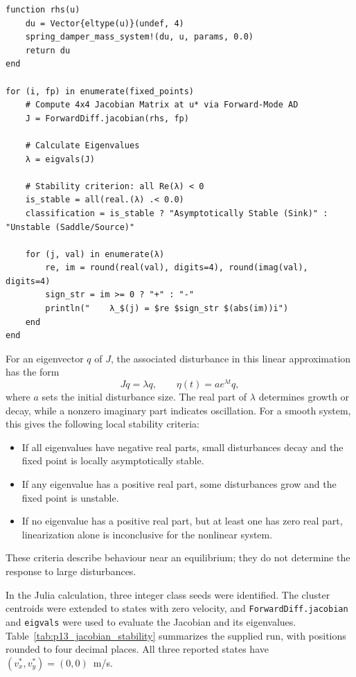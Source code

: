 \begin{verbatim}
function rhs(u)
    du = Vector{eltype(u)}(undef, 4)
    spring_damper_mass_system!(du, u, params, 0.0)
    return du
end

for (i, fp) in enumerate(fixed_points)
    # Compute 4x4 Jacobian Matrix at u* via Forward-Mode AD
    J = ForwardDiff.jacobian(rhs, fp)
    
    # Calculate Eigenvalues
    λ = eigvals(J)
    
    # Stability criterion: all Re(λ) < 0
    is_stable = all(real.(λ) .< 0.0)
    classification = is_stable ? "Asymptotically Stable (Sink)" : "Unstable (Saddle/Source)"
    
    for (j, val) in enumerate(λ)
        re, im = round(real(val), digits=4), round(imag(val), digits=4)
        sign_str = im >= 0 ? "+" : "-"
        println("    λ_$(j) = $re $sign_str $(abs(im))i")
    end
end
\end{verbatim}

For an eigenvector $q$ of $J$, the associated disturbance in this linear approximation has the form
\begin{equation}
    Jq=\lambda q, \qquad \eta(t)=a e^{\lambda t}q,
\end{equation}
where $a$ sets the initial disturbance size. The real part of $\lambda$ determines growth or decay, while a nonzero imaginary part indicates oscillation. For a smooth system, this gives the following local stability criteria:
\begin{itemize}
    \item If all eigenvalues have negative real parts, small disturbances decay and the fixed point is locally asymptotically stable.
    \item If any eigenvalue has a positive real part, some disturbances grow and the fixed point is unstable.
    \item If no eigenvalue has a positive real part, but at least one has zero real part, linearization alone is inconclusive for the nonlinear system.
\end{itemize}
These criteria describe behaviour near an equilibrium; they do not determine the response to large disturbances.

In the Julia calculation, three integer class seeds were identified. The cluster centroids were extended to states with zero velocity, and \texttt{ForwardDiff.jacobian} and \texttt{eigvals} were used to evaluate the Jacobian and its eigenvalues. Table~\ref{tab:p13_jacobian_stability} summarizes the supplied run, with positions rounded to four decimal places. All three reported states have $(v_x^*,v_y^*)=(0,0)$~m/s.

